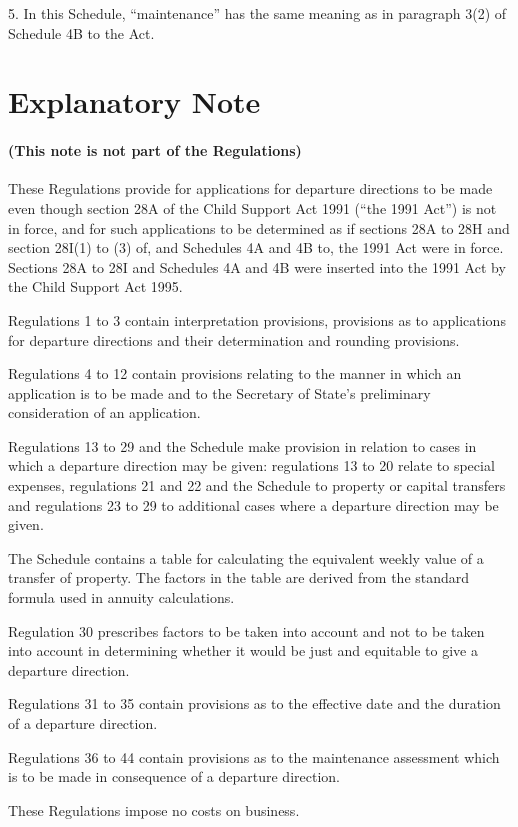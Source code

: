 \documentclass[a4paper]{article}
\newcommand{\parthead}{}
\begin{document}
\medskip

5.  In this Schedule, “maintenance” has the same meaning as in paragraph 3(2) of Schedule 4B to the Act.

\part{Explanatory Note}

\renewcommand\parthead{--- Explanatory Note}

\subsection*{(This note is not part of the Regulations)}

These Regulations provide for applications for departure directions to be made even though section 28A of the Child Support Act 1991 (“the 1991 Act”) is not in force, and for such applications to be determined as if sections 28A to 28H and section 28I(1) to (3) of, and Schedules 4A and 4B to, the 1991 Act were in force. Sections 28A to 28I and Schedules 4A and 4B were inserted into the 1991 Act by the Child Support Act 1995.

  Regulations 1 to 3 contain interpretation provisions, provisions as to applications for departure directions and their determination and rounding provisions.

  Regulations 4 to 12 contain provisions relating to the manner in which an application is to be made and to the Secretary of State’s preliminary consideration of an application.

  Regulations 13 to 29 and the Schedule make provision in relation to cases in which a departure direction may be given: regulations 13 to 20 relate to special expenses, regulations 21 and 22 and the Schedule to property or capital transfers and regulations 23 to 29 to additional cases where a departure direction may be given.

  The Schedule contains a table for calculating the equivalent weekly value of a transfer of property. The factors in the table are derived from the standard formula used in annuity calculations.

  Regulation 30 prescribes factors to be taken into account and not to be taken into account in determining whether it would be just and equitable to give a departure direction.

  Regulations 31 to 35 contain provisions as to the effective date and the duration of a departure direction.

  Regulations 36 to 44 contain provisions as to the maintenance assessment which is to be made in consequence of a departure direction.

  These Regulations impose no costs on business.
\end{document}
